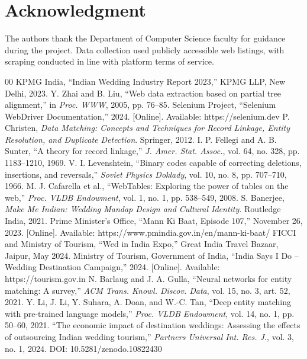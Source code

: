\documentclass[conference]{IEEEtran}
\begin{document}
\section*{Acknowledgment}

The authors thank the Department of Computer Science faculty for guidance during the project. Data collection used publicly accessible web listings, with scraping conducted in line with platform terms of service.

\begin{thebibliography}{00}
 KPMG India, ``Indian Wedding Industry Report 2023,'' KPMG LLP, New Delhi, 2023.
 Y. Zhai and B. Liu, ``Web data extraction based on partial tree alignment,'' in \textit{Proc. WWW}, 2005, pp. 76--85.
 Selenium Project, ``Selenium WebDriver Documentation,'' 2024. [Online]. Available: https://selenium.dev
 P. Christen, \textit{Data Matching: Concepts and Techniques for Record Linkage, Entity Resolution, and Duplicate Detection}. Springer, 2012.
 I. P. Fellegi and A. B. Sunter, ``A theory for record linkage,'' \textit{J. Amer. Stat. Assoc.}, vol. 64, no. 328, pp. 1183--1210, 1969.
 V. I. Levenshtein, ``Binary codes capable of correcting deletions, insertions, and reversals,'' \textit{Soviet Physics Doklady}, vol. 10, no. 8, pp. 707--710, 1966.
 M. J. Cafarella et al., ``WebTables: Exploring the power of tables on the web,'' \textit{Proc. VLDB Endowment}, vol. 1, no. 1, pp. 538--549, 2008.
 S. Banerjee, \textit{Make Me Indian: Wedding Mandap Design and Cultural Identity}. Routledge India, 2021.
 Prime Minister's Office, ``Mann Ki Baat, Episode 107,'' November 26, 2023. [Online]. Available: https://www.pmindia.gov.in/en/mann-ki-baat/
 FICCI and Ministry of Tourism, ``Wed in India Expo,'' Great India Travel Bazaar, Jaipur, May 2024.
 Ministry of Tourism, Government of India, ``India Says I Do -- Wedding Destination Campaign,'' 2024. [Online]. Available: https://tourism.gov.in
 N. Barlaug and J. A. Gulla, ``Neural networks for entity matching: A survey,'' \textit{ACM Trans. Knowl. Discov. Data}, vol. 15, no. 3, art. 52, 2021.
 Y. Li, J. Li, Y. Suhara, A. Doan, and W.-C. Tan, ``Deep entity matching with pre-trained language models,'' \textit{Proc. VLDB Endowment}, vol. 14, no. 1, pp. 50--60, 2021.
 ``The economic impact of destination weddings: Assessing the effects of outsourcing Indian wedding tourism,'' \textit{Partners Universal Int. Res. J.}, vol. 3, no. 1, 2024. DOI: 10.5281/zenodo.10822430

\end{thebibliography}
\end{document}
